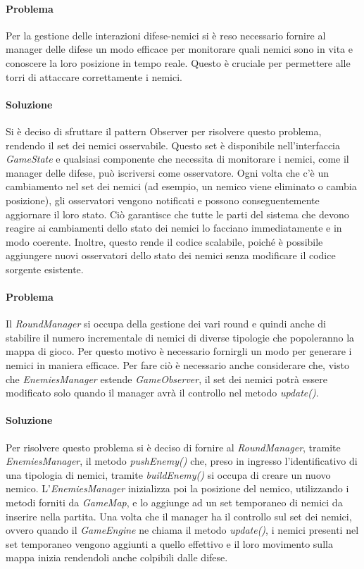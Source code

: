 \documentclass[a4paper,12pt]{report}
\begin{document}
\paragraph{Problema} Per la gestione delle interazioni difese-nemici si è reso necessario fornire al manager delle difese un modo efficace per monitorare quali nemici sono in vita e conoscere la loro posizione in tempo reale. Questo è cruciale per permettere alle torri di attaccare correttamente i nemici.

\paragraph{Soluzione} Si è deciso di sfruttare il pattern Observer per risolvere questo problema, rendendo il set dei nemici osservabile. Questo set è disponibile nell'interfaccia \textit{GameState} e qualsiasi componente che necessita di monitorare i nemici, come il manager delle difese, può iscriversi come osservatore. Ogni volta che c'è un cambiamento nel set dei nemici (ad esempio, un nemico viene eliminato o cambia posizione), gli osservatori vengono notificati e possono conseguentemente aggiornare il loro stato. Ciò garantisce che tutte le parti del sistema che devono reagire ai cambiamenti dello stato dei nemici lo facciano immediatamente e in modo coerente. Inoltre, questo rende il codice scalabile, poiché è possibile aggiungere nuovi osservatori dello stato dei nemici senza modificare il codice sorgente esistente.

\paragraph{Problema} Il \textit{RoundManager} si occupa della gestione dei vari round e quindi anche di stabilire il numero incrementale di nemici di diverse tipologie che popoleranno la mappa di gioco. Per questo motivo è necessario fornirgli un modo per generare i nemici in maniera efficace. Per fare ciò è necessario anche considerare che, visto che \textit{EnemiesManager} estende \textit{GameObserver}, il set dei nemici potrà essere modificato solo quando il manager avrà il controllo nel metodo \textit{update()}.

\paragraph{Soluzione} Per risolvere questo problema si è deciso di fornire al \textit{RoundManager}, tramite \textit{EnemiesManager}, il metodo \textit{pushEnemy()} che, preso in ingresso l'identificativo di una tipologia di nemici, tramite \textit{buildEnemy()} si occupa di creare un nuovo nemico. L'\textit{EnemiesManager} inizializza poi la posizione del nemico, utilizzando i metodi forniti da \textit{GameMap}, e lo aggiunge ad un set temporaneo di nemici da inserire nella partita. Una volta che il manager ha il controllo sul set dei nemici, ovvero quando il \textit{GameEngine} ne chiama il metodo \textit{update()}, i nemici presenti nel set temporaneo vengono aggiunti a quello effettivo e il loro movimento sulla mappa inizia rendendoli anche colpibili dalle difese.
\end{document}
